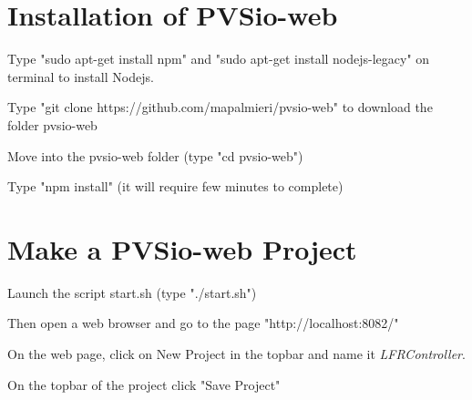 \documentclass[11pt,a4paper]{../tutorial}
\begin{document}
\section{Installation of PVSio-web}
\begin{instructions}
\item Type "sudo apt-get install npm" and "sudo apt-get install nodejs-legacy" on terminal to install Nodejs.
\item Type "git clone https://github.com/mapalmieri/pvsio-web" to download the folder pvsio-web
\item Move into the pvsio-web folder (type "cd pvsio-web")
\item Type "npm install" (it will require few minutes to complete)

\end{instructions}
\section{Make a PVSio-web Project}
\begin{instructions}
\item Launch the script start.sh (type "./start.sh")
\item Then open a web browser and go to the page "http://localhost:8082/"
\item On the web page, click on New Project in the topbar and name it \emph{LFRController}.
\item On the topbar of the project click "Save Project" 

\end{instructions}
\end{document}
